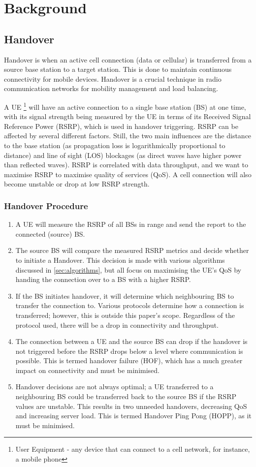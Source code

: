 \chapter{Background}
\section{Handover}
Handover is when an active cell connection (data or cellular) is transferred from a source base station to a target station. This is done to maintain continuous connectivity for mobile devices. Handover is a crucial technique in radio communication networks for mobility management and load balancing.

A UE \footnote{User Equipment - any device that can connect to a cell network, for instance, a mobile phone} will have an active connection to a single base station (BS) at one time, with its signal strength being measured by the UE in terms of its Received Signal Reference Power (RSRP), which is used in handover triggering. RSRP can be affected by several different factors. Still, the two main influences are the distance to the base station (as propagation loss is logarithmically proportional to distance) and line of sight (LOS) blockages (as direct waves have higher power than reflected waves). 
RSRP is correlated with data throughput, and we want to maximise RSRP to maximise quality of services (QoS). A cell connection will also become unstable or drop at low RSRP strength.

\subsection{Handover Procedure}
\begin{enumerate}
    \item A UE will measure the RSRP of all BSs in range and send the report to the connected (source) BS.
    \item The source BS will compare the measured RSRP metrics and decide whether to initiate a Handover. This decision is made with various algorithms discussed in \ref{sec:algorithms}, but all focus on maximising the UE's QoS by handing the connection over to a BS with a higher RSRP.
    \item If the BS initiates handover, it will determine which neighbouring BS to transfer the connection to. Various protocols determine how a connection is transferred; however, this is outside this paper's scope. Regardless of the protocol used, there will be a drop in connectivity and throughput.
    \item The connection between a UE and the source BS can drop if the handover is not triggered before the RSRP drops below a level where communication is possible. This is termed handover failure (HOF), which has a much greater impact on connectivity and must be minimised.
    \item Handover decisions are not always optimal; a UE transferred to a neighbouring BS could be transferred back to the source BS if the RSRP values are unstable. This results in two unneeded handovers, decreasing QoS and increasing server load. This is termed Handover Ping Pong (HOPP), as it must be minimised.
\end{enumerate}

